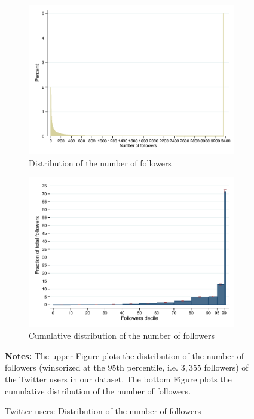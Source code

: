 \clearpage
\pagebreak
\begin{figure}
\begin{center}
\begin{subfigure}{1\textwidth}
 	    \centering
 	    \includegraphics[scale=.9]{figures/distribution_users}
 	    \caption{Distribution of the number of followers}
 	    \label{fig:distribution_users}
\end{subfigure}
\begin{subfigure}{1\textwidth}
 	    \centering
 	    \includegraphics[scale=.9]{figures/cumulative_distribution_followers}
 	    \caption{Cumulative distribution of the number of followers}
 	    \label{fig:cumulative_distribution_followers}
\end{subfigure}
\end{center}
	\begin{spacing}{0.5}
		{\footnotesize \textbf{Notes:} The upper Figure plots the distribution of the number of followers (winsorized at the 95th percentile, i.e. $3,355$ followers) of the Twitter users in our dataset. The bottom Figure plots the cumulative distribution of the number of followers.}
	\end{spacing}
\vspace{.5cm}	
	\caption{Twitter users: Distribution of the number of followers}
	\label{fig:users}
\end{figure}
